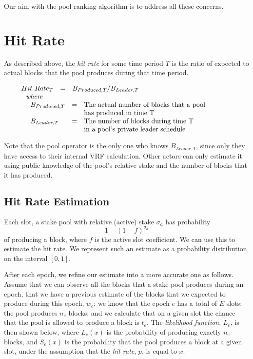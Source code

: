 \documentclass[11pt,a4paper,dvipsnames,twosided]{article}
\begin{document}
Our aim with the pool ranking algorithm is to address all these concerns.

\section{Hit Rate}

As described above, the \emph{hit rate} for some time period $T$ is the ratio of expected to actual blocks
that the pool produces during that time period.

$$
\begin{array}{l}
  \begin{array}{lclp{3in}}
    Hit~Rate_T &=& B_{Produced,T} / B_{Leader,T} \\
  ~~ \textit{where} \\
  \end{array}
\\
~~~~
  \begin{array}{lcp{3in}}
      B_{Produced,T} &=& \text{The actual number of blocks that a pool}\\
      && \text{has produced in time T}\\
      B_{Leader,T} &=& \text{The number of blocks during time T}\\
      && \text{in a pool's private leader schedule}
  \end{array}
\end{array}
$$

Note that the pool operator is the only one who knows $B_{Leader,T}$,
since only they have access to their internal VRF calculation.
Other actors can only estimate it using public knowledge of the
pool's relative stake and the number of blocks that it has produced.

\subsection{Hit Rate Estimation}

Each slot, a stake pool with relative (active) stake $\sigma_a$ has probability
\[ 1 - (1-f)^{\sigma_a} \]
of producing a block, where $f$ is the active slot coefficient.
We can use this to estimate the hit rate.
%
We represent such an estimate as a probability distribution on the interval $[0,1]$.

After each epoch, we refine our estimate into a more accurate one as follows.
%
Assume that we can
observe all the blocks that a stake pool produces during an epoch, that we have a previous estimate of the blocks that
we expected to produce during this epoch, $w_e$; we know that the
epoch $e$ has a total of $E$ slots; the pool produces $n_e$ blocks; and we calculate that on a given slot
the chance that the pool is allowed to produce a block is $t_e$.
%
The \emph{likelihood function}, $L_e$, is then shown below, where $L_e(x)$ is the probability of producing exactly $n_e$ blocks,
and $S_e(x)$ is the probability that the pool produces a block at a given slot, under the assumption that the
\emph{hit rate}, $p$, is equal to $x$.
\end{document}
